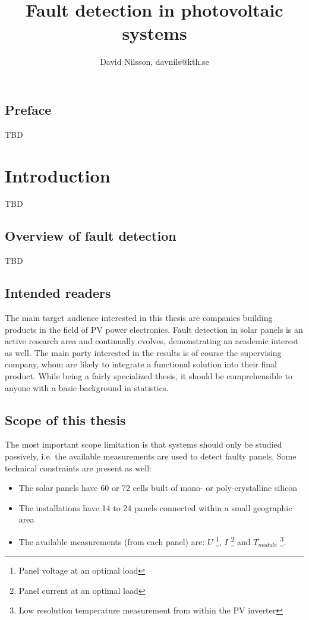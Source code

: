 \documentclass[a4paper,11pt]{report}
\title{Fault detection in photovoltaic systems}
\author{David Nilsson, davnils@kth.se}
\begin{document}

\maketitle



\section*{Preface}
TBD

\tableofcontents

\printglossaries
\clearpage


\chapter{Introduction}
TBD

\section{Overview of fault detection}
TBD

\section{Intended readers}
The main target audience interested in this thesis are companies building products in the field of PV power electronics.
Fault detection in solar panels is an active research area and continually evolves, demonstrating an academic interest as well.
The main party interested in the results is of course the supervising company, whom are likely to
integrate a functional solution into their final product.
While being a fairly specialized thesis, it should be comprehensible to anyone with a basic background in statistics.

\section{Scope of this thesis}
The most important scope limitation is that systems should only be studied passively, i.e. the available measurements are used to detect faulty panels.  
Some technical constraints are present as well:
\begin{itemize}
\item The solar panels have 60 or 72 cells built of mono- or poly-crystalline silicon

\item The installations have 14 to 24 panels connected within a small geographic area

\item The available measurements (from each panel) are:
$U$ \footnote{Panel voltage at an optimal load},
$I$ \footnote{Panel current at an optimal load} and
$T_{module}$ \footnote{Low resolution temperature measurement from within the PV inverter}.

\end{itemize}
\end{document}

